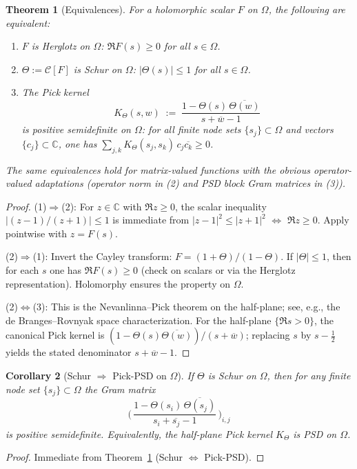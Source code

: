 \documentclass[11pt]{article}
\newtheorem{theorem}{Theorem}
\newtheorem{corollary}[theorem]{Corollary}
\theoremstyle{definition}
\theoremstyle{remark}
\newcommand{\C}{\mathbb{C}}
\begin{document}
\begin{theorem}[Equivalences]\label{thm:equivalences}
For a holomorphic scalar \(F\) on \(\Omega\), the following are equivalent:
\begin{enumerate}
 \item \(F\) is Herglotz on \(\Omega\): \(\Re F(s)\ge 0\) for all \(s\in\Omega\).
 \item \(\Theta:=\mathcal C[F]\) is Schur on \(\Omega\): \(|\Theta(s)|\le 1\) for all \(s\in\Omega\).
 \item The Pick kernel
 \[
  K_\Theta(s,w)\;:=\;\frac{1-\Theta(s)\,\overline{\Theta(w)}}{s+\overline{w}-1}
 \]
 is positive semidefinite on \(\Omega\): for all finite node sets \(\{s_j\}\subset\Omega\) and vectors \(\{c_j\}\subset\C\), one has \(\sum_{j,k} K_\Theta(s_j,s_k)\,c_j\overline{c_k}\ge 0\).
\end{enumerate}
The same equivalences hold for matrix-valued functions with the obvious operator-valued adaptations (operator norm in (2) and PSD block Gram matrices in (3)).
\end{theorem}
\begin{proof}
(1)\(\Rightarrow\)(2): For \(z\in\C\) with \(\Re z\ge 0\), the scalar inequality \(|(z-1)/(z+1)|\le 1\) is immediate from \(|z-1|^2\le |z+1|^2\) \(\Leftrightarrow\) \(\Re z\ge 0\). Apply pointwise with \(z=F(s)\).

(2)\(\Rightarrow\)(1): Invert the Cayley transform: \(F=(1+\Theta)/(1-\Theta)\). If \(|\Theta|\le 1\), then for each \(s\) one has \(\Re F(s)\ge 0\) (check on scalars or via the Herglotz representation). Holomorphy ensures the property on \(\Omega\).

(2)\(\Leftrightarrow\)(3): This is the Nevanlinna--Pick theorem on the half-plane; see, e.g., the de Branges--Rovnyak space characterization. For the half-plane \(\{\Re s>0\}\), the canonical Pick kernel is \((1-\Theta(s)\overline{\Theta(w)})/(s+\overline{w})\); replacing \(s\) by \(s-\tfrac12\) yields the stated denominator \(s+\overline{w}-1\).
\end{proof}

\begin{corollary}[Schur \(\Rightarrow\) Pick-PSD on \(\Omega\)]\label{cor:schur-pick-psd}
If \(\Theta\) is Schur on \(\Omega\), then for any finite node set \(\{s_j\}\subset\Omega\) the Gram matrix
\[
\Big(\,\frac{1-\Theta(s_i)\,\overline{\Theta(s_j)}}{\,s_i+\overline{s_j}-1\,}\,\Big)_{i,j}
\]
is positive semidefinite. Equivalently, the half-plane Pick kernel \(K_\Theta\) is PSD on \(\Omega\).
\end{corollary}
\begin{proof}
Immediate from Theorem~\ref{thm:equivalences} (Schur \(\Leftrightarrow\) Pick-PSD).
\end{proof}
\end{document}
